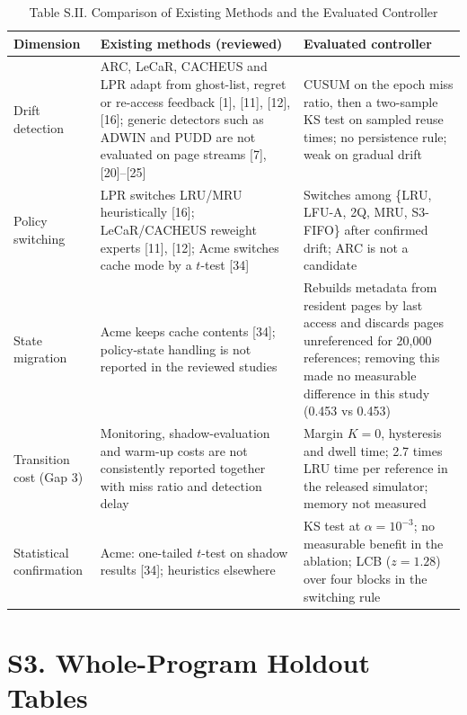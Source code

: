\documentclass[journal,onecolumn]{IEEEtran}
\begin{document}
\begin{table}[!t]
\caption{Table S.II. Comparison of Existing Methods and the Evaluated Controller}
\label{tab:compare}
\footnotesize
\setlength{\tabcolsep}{5.4pt}
\begin{tabular}{@{}p{}p{}p{}@{}}
\toprule
Dimension & Existing methods (reviewed) & Evaluated controller \\
\midrule
Drift detection & ARC, LeCaR, CACHEUS and LPR adapt from ghost-list, regret or re-access feedback [1], [11], [12], [16]; generic detectors such as ADWIN and PUDD are not evaluated on page streams [7], [20]--[25] & CUSUM on the epoch miss ratio, then a two-sample KS test on sampled reuse times; no persistence rule; weak on gradual drift \\
Policy switching & LPR switches LRU/MRU heuristically [16]; LeCaR/CACHEUS reweight experts [11], [12]; Acme switches cache mode by a $t$-test [34] & Switches among \{LRU, LFU-A, 2Q, MRU, S3-FIFO\} after confirmed drift; ARC is not a candidate \\
State migration & Acme keeps cache contents [34]; policy-state handling is not reported in the reviewed studies & Rebuilds metadata from resident pages by last access and discards pages unreferenced for 20,000 references; removing this made no measurable difference in this study (0.453 vs 0.453) \\
Transition cost (Gap 3) & Monitoring, shadow-evaluation and warm-up costs are not consistently reported together with miss ratio and detection delay & Margin $K = 0$, hysteresis and dwell time; 2.7 times LRU time per reference in the released simulator; memory not measured \\
Statistical confirmation & Acme: one-tailed $t$-test on shadow results [34]; heuristics elsewhere & KS test at $\alpha = 10^{-3}$; no measurable benefit in the ablation; LCB ($z = 1.28$) over four blocks in the switching rule \\
\bottomrule
\end{tabular}
\end{table}

\section{S3. Whole-Program Holdout Tables}
\end{document}
